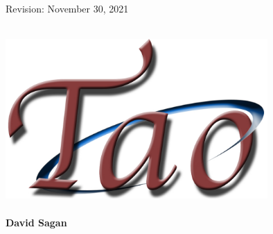 \thispagestyle{empty}

\begin{flushright}
\large
Revision: November 30, 2021 \\
\end{flushright}

\vfill

{
\begin{center}
 \\
\vskip 0.2in
\includegraphics[width=10cm]{tao-logo.pdf} \\
\vskip 0.3in
 \\
\vskip 0.4in
{\huge \sf\bf David Sagan} \\
\end{center}
}

\vfill
\break
